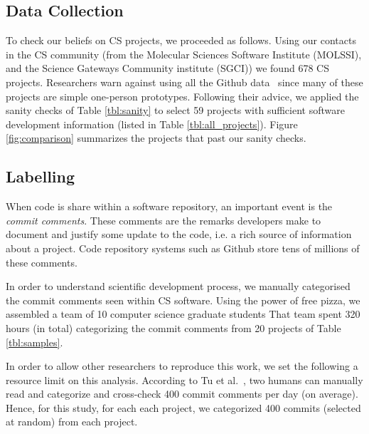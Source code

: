 \documentclass[sigconf,review,anonymous]{acmart}
\begin{document}
\subsection{Data Collection}

To check our beliefs on CS projects, we proceeded as follows. 
Using our contacts in the CS community
(from the Molecular Sciences Software Institute (MOLSSI), and the Science Gateways Community institute (SGCI)) we found
678 CS  projects.
Researchers
warn against using all the Github data~\cite{bird09promise,agrawal2018we, eirini15promise, munaiah17curating} since
many of these projects are simple one-person prototypes.
Following  their advice, we applied the sanity checks of Table \ref{tbl:sanity}
to select 59  projects with sufficient software development information 
(listed in Table \ref{tbl:all_projects}). Figure \ref{fig:comparison} summarizes the projects that past our sanity checks.
 
 \subsection{Labelling}
 When code is share
 within a software  repository, an important event is the {\em commit comments}.  These comments are the remarks developers make to document and justify some update to the code, i.e. a rich source of information about a project. Code repository systems such as Github store tens of millions of these comments. 
 
 In order to understand scientific development process, we manually categorised
 the   commit comments seen within CS
 software. 
Using the power of free pizza, we assembled a team of 10 computer science 
graduate students
That  team spent  320 hours (in total) categorizing 
 the commit comments from 20 projects of Table \ref{tbl:samples}.

 In order to allow other researchers to reproduce this work, we set
 the following
 a resource limit on  this analysis.
 According to Tu et al.~\cite{tu2019better}, two humans can manually read and categorize
 and cross-check 400 commit comments per day (on average).
Hence, for this study, for each each project, we categorized 400 commits
(selected at random) from each project. 
\end{document}
